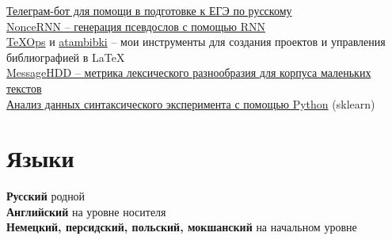 \documentclass[11pt]{article} %
\begin{document}
\href{https://github.com/thddbptnsndshs/arguementor}{Телеграм-бот для помощи в подготовке к ЕГЭ по русскому}\\
\href{https://github.com/thddbptnsndshs/nonce-words}{NonceRNN -- генерация псевдослов с помощью RNN}\\
\href{https://github.com/thddbptnsndshs/texops}{TeXOps} и \href{https://github.com/thddbptnsndshs/atambibki}{atambibki} -- мои инструменты для создания проектов и управления библиографией в LaTeX\\
\href{https://github.com/thddbptnsndshs/MessageHDD}{MessageHDD -- метрика лексического разнообразия для корпуса маленьких текстов}\\
\href{https://github.com/thddbptnsndshs/idioms}{Анализ данных синтаксического эксперимента с помощью Python} (sklearn)\\

\section*{Языки}

\textbf{Русский} родной\\
\textbf{Английский} на уровне носителя\\
\textbf{Немецкий, персидский, польский, мокшанский} на начальном уровне




\end{document}
